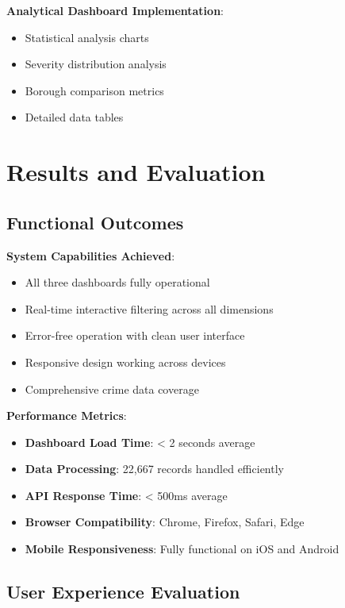 \documentclass[12pt,a4paper]{article}
\begin{document}
\textbf{Analytical Dashboard Implementation}:
\begin{itemize}
    \item Statistical analysis charts
    \item Severity distribution analysis
    \item Borough comparison metrics
    \item Detailed data tables
\end{itemize}

\section{Results and Evaluation}

\subsection{Functional Outcomes}

\textbf{System Capabilities Achieved}:
\begin{itemize}
    \item[\checkmark] All three dashboards fully operational
    \item[\checkmark] Real-time interactive filtering across all dimensions
    \item[\checkmark] Error-free operation with clean user interface
    \item[\checkmark] Responsive design working across devices
    \item[\checkmark] Comprehensive crime data coverage
\end{itemize}

\textbf{Performance Metrics}:
\begin{itemize}
    \item \textbf{Dashboard Load Time}: < 2 seconds average
    \item \textbf{Data Processing}: 22,667 records handled efficiently
    \item \textbf{API Response Time}: < 500ms average
    \item \textbf{Browser Compatibility}: Chrome, Firefox, Safari, Edge
    \item \textbf{Mobile Responsiveness}: Fully functional on iOS and Android
\end{itemize}

\subsection{User Experience Evaluation}
\end{document}
